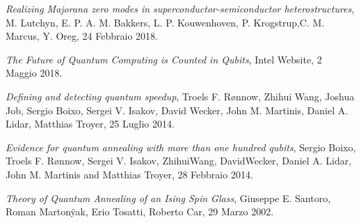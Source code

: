 \begin{thebibliography}{99}
    \textit{Realizing Majorana zero modes in superconductor-semiconductor heterostructures},
    M. Lutchyn, E. P. A. M. Bakkers, L. P. Kouwenhoven, P. Krogstrup,C. M. Marcus, Y. Oreg,
    24 Febbraio 2018.

    \textit{The Future of Quantum Computing is Counted in Qubits},
    Intel Website,
    2 Maggio 2018.

    \textit{Defining and detecting quantum speedup},
    Troels F. Rønnow, Zhihui Wang, Joshua Job, Sergio Boixo, Sergei V. Isakov, David Wecker, John M. Martinis, Daniel A. Lidar, Matthias Troyer,
    25 Luglio 2014.

    \textit{Evidence for quantum annealing with more than
one hundred qubits},
    Sergio Boixo, Troels F. Rønnow, Sergei V. Isakov, ZhihuiWang, DavidWecker, Daniel A. Lidar, John M. Martinis and Matthias Troyer,
    28 Febbraio 2014.

    \textit{Theory of Quantum Annealing of an Ising Spin Glass},
    Giuseppe E. Santoro, Roman Martonÿak, Erio Tosatti, Roberto Car,
    29 Marzo 2002.

\end{thebibliography}
